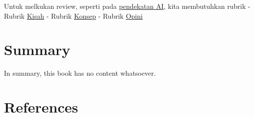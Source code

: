 \documentclass[
  letterpaper,
  DIV=11,
  numbers=noendperiod]{scrreprt}
\begin{document}
Untuk melkukan review, seperti pada
\href{../My_Personal_Reviews/Doc.5.Mengevaluasi-Esai-Berdasarkan-Rubrik.pdf}{pendekatan
AI}, kita membutuhkan rubrik - Rubrik
\href{Dok.4.a.Rubrik_Kisah.pdf}{Kisah} - Rubrik
\href{Dok.4.b.Rubrik_Konsep.pdf}{Konsep} - Rubrik
\href{Dok.4.c.Rubrik_Opini.pdf}{Opini}


\chapter{Summary}\label{summary}

In summary, this book has no content whatsoever.


\chapter*{References}\label{references}


\label{refs}
\end{document}
